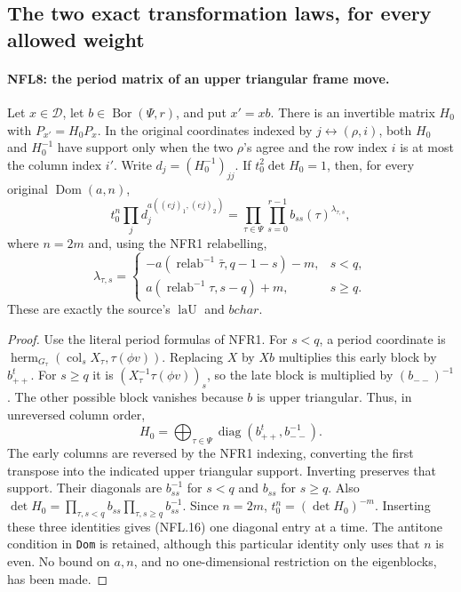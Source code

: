 \documentclass[11pt,a4paper]{article}
\numberwithin{equation}{section}
\theoremstyle{remark}\newtheorem{remark}[theorem]{Remark}
\begin{document}
\subsection{The two exact transformation laws, for every allowed weight}

\paragraph{NFL8: the period matrix of an upper triangular frame move.}
\label{claim:NFL8}
Let $x\in\mathcal D$, let $b\in\operatorname{Bor}(\Psi,r)$, and
put $x'=xb$.  There is an invertible matrix $H_0$ with
$P_{x'}=H_0P_x$.  In the original coordinates indexed by
$j\leftrightarrow(\rho,i)$, both $H_0$ and $H_0^{-1}$ have support
only when the two $\rho$'s agree and the row index $i$ is at most
the column index $i'$.  Write $d_j=(H_0^{-1})_{jj}$.
If $t_0^2\det H_0=1$, then, for every original $\operatorname{Dom}(a,n)$,
\[
 t_0^n\prod_jd_j^{a((ej)_1,(ej)_2)}
       =\prod_{\tau\in\Psi}\prod_{s=0}^{r-1}
                       b_{ss}(\tau)^{\lambda_{\tau,s}},
 \tag{NFL.16}
\]
where $n=2m$ and, using the NFR1 relabelling,
\[
 \lambda_{\tau,s}=
 \begin{cases}
 -a(\operatorname{relab}^{-1}\bar\tau,q-1-s)-m,&s<q,\\
 a(\operatorname{relab}^{-1}\tau,s-q)+m,&s\ge q.
 \end{cases}
 \tag{NFL.17}
\]
These are exactly the source's $\operatorname{laU}$ and $bchar$.

\begin{proof}
Use the literal period formulas of NFR1.  For $s<q$, a period
coordinate is $\operatorname{herm}_{G_\tau}(\operatorname{col}_sX_\tau,
\tau(\phi v))$.  Replacing $X$ by $Xb$ multiplies this early
block by $b_{++}^t$.  For $s\ge q$ it is
$(X_\tau^{-1}\tau(\phi v))_s$, so the late block is multiplied
by $(b_{--})^{-1}$.  The other possible block vanishes because
$b$ is upper triangular.  Thus, in unreversed column order,
\[
 H_0=\bigoplus_{\tau\in\Psi}
            \operatorname{diag}(b_{++}^t,b_{--}^{-1}).
 \tag{NFL.18}
\]
The early columns are reversed by the NFR1 indexing, converting
the first transpose into the indicated upper triangular support.
Inverting preserves that support.  Their diagonals are
$b_{ss}^{-1}$ for $s<q$ and $b_{ss}$ for $s\ge q$.
Also $\det H_0=\prod_{\tau,s<q}b_{ss}
\prod_{\tau,s\ge q}b_{ss}^{-1}$.
Since $n=2m$, $t_0^n=(\det H_0)^{-m}$.  Inserting these three
identities gives (NFL.16) one diagonal entry at a time.
The antitone condition in \texttt{Dom} is retained, although this
particular identity only uses that $n$ is even.  No bound on
$a,n$, and no one-dimensional restriction on the eigenblocks,
has been made.
\end{proof}
\end{document}
